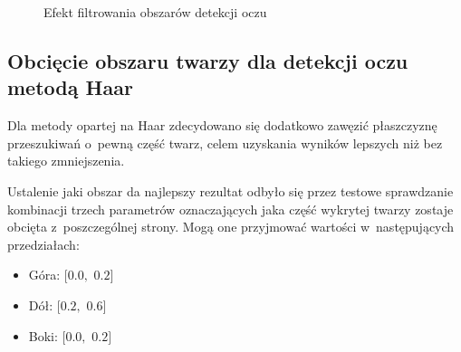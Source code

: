 \begin{figure}[!h]
    \begin{center}
        \hspace{8mm}
    \end{center}
    \caption{Efekt filtrowania obszarów detekcji oczu}
    \label{fig:eye_filter}
\end{figure}

\subsection{Obcięcie obszaru twarzy dla detekcji oczu metodą Haar}

Dla metody opartej na Haar zdecydowano się dodatkowo zawęzić płaszczyznę przeszukiwań o~pewną część twarz, celem uzyskania wyników lepszych niż bez takiego zmniejszenia. 

\par

Ustalenie jaki obszar da najlepszy rezultat odbyło się przez testowe sprawdzanie kombinacji trzech parametrów oznaczających jaka część wykrytej twarzy zostaje obcięta z~poszczególnej strony. Mogą one przyjmować wartości w~następujących przedziałach:

\begin{itemize}
    \item Góra: $[0.0,$ $0.2]$
    \item Dół: $[0.2,$ $0.6]$
    \item Boki: $[0.0,$ $0.2]$
\end{itemize}

